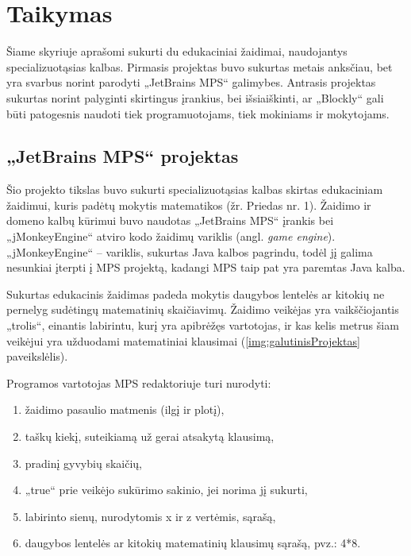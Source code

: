 \documentclass{VUMIFPSkursinis}
\begin{document}
\section{Taikymas}

Šiame skyriuje aprašomi sukurti du edukaciniai žaidimai, naudojantys specializuotąsias kalbas. Pirmasis projektas buvo sukurtas metais anksčiau, bet yra svarbus norint parodyti „JetBrains MPS“ galimybes. Antrasis projektas sukurtas norint palyginti skirtingus įrankius, bei išsiaiškinti, ar „Blockly“ gali būti patogesnis naudoti tiek programuotojams, tiek mokiniams ir mokytojams.

\subsection{„JetBrains MPS“ projektas}

Šio projekto tikslas buvo sukurti specializuotąsias kalbas skirtas edukaciniam žaidimui, kuris padėtų mokytis matematikos (žr. Priedas nr. 1).
Žaidimo ir domeno kalbų kūrimui buvo naudotas „JetBrains MPS“ įrankis bei „jMonkeyEngine“ atviro kodo žaidimų variklis (angl. \textit{game engine}). „jMonkeyEngine“ -- variklis, sukurtas Java kalbos pagrindu, todėl jį galima nesunkiai įterpti į MPS projektą, kadangi MPS taip pat yra paremtas Java kalba.

Sukurtas edukacinis žaidimas padeda mokytis daugybos lentelės ar kitokių ne pernelyg sudėtingų matematinių skaičiavimų. Žaidimo veikėjas yra vaikščiojantis „trolis“, einantis labirintu, kurį yra apibrėžęs vartotojas, ir kas kelis metrus šiam veikėjui yra užduodami matematiniai klausimai (\ref{img:galutinisProjektas} paveikslėlis).

Programos vartotojas MPS redaktoriuje turi nurodyti:
\begin{enumerate}
\item žaidimo pasaulio matmenis (ilgį ir plotį),
\item taškų kiekį, suteikiamą už gerai atsakytą klausimą,
\item pradinį gyvybių skaičių,
\item „true“ prie veikėjo sukūrimo sakinio, jei norima jį sukurti,
\item labirinto sienų, nurodytomis x ir z vertėmis, sąrašą,
\item daugybos lentelės ar kitokių matematinių klausimų sąrašą, pvz.: 4*8.
\end{enumerate}
\end{document}
